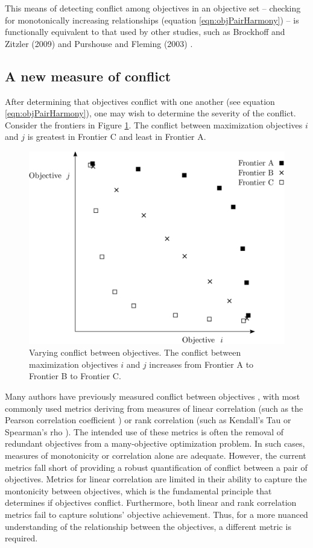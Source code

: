 This means of detecting conflict among objectives in an objective set -- checking for monotonically increasing relationships (equation \eqref{eqn:objPairHarmony}) -- is functionally equivalent to that used by other studies, such as Brockhoff and Zitzler (2009) \cite{brockhoff2009objective} and Purshouse and Fleming (2003) \cite{purshouse2003conflict}.

\subsection{A new measure of conflict}
After determining that objectives conflict with one another (see equation \eqref{eqn:objPairHarmony}), one may wish to determine the severity of the conflict. Consider the frontiers in Figure \ref{fig:ConflictVariesExample}. The conflict between maximization objectives $i$ and $j$ is greatest in Frontier C and least in Frontier A.
\begin{figure}[ht]
\centering
\includegraphics[width=.6\textwidth]{../images/ConflictVariesExample}
\caption[Example of varying conflict between objectives]{Varying conflict between objectives. The conflict between maximization objectives $i$ and $j$ increases from Frontier A to Frontier B to Frontier C.}
\label{fig:ConflictVariesExample}
\end{figure}

Many authors have previously measured conflict between objectives \cite{brockhoff2009objective}\cite{purshouse2003conflict}\cite{gal1977redundant}, with most commonly used metrics deriving from measures of linear correlation (such as the Pearson correlation coefficient \cite{deb2006searching}) or rank correlation (such as Kendall's Tau \cite{kanoulas2009empirical} or Spearman's rho \cite{karande2012application}%
). The intended use of these metrics is often the removal of redundant objectives from a many-objective optimization problem. In such cases, measures of monotonicity or correlation alone are adequate. However, the current metrics fall short of providing a robust quantification of conflict between a pair of objectives. Metrics for linear correlation are limited in their ability to capture the montonicity between objectives, which is the fundamental principle that determines if objectives conflict. Furthermore, both linear and rank correlation metrics fail to capture solutions' objective achievement. Thus, for a more nuanced understanding of the relationship between the objectives, a different metric is required.

